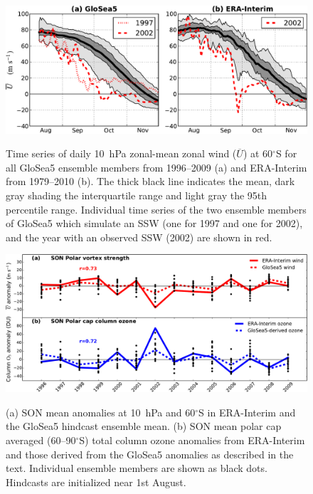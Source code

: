\begin{figure}[t]
  \noindent\includegraphics[width=\textwidth,angle=0]{figures/GloSea5/zmzw_climatologies_crop.pdf}\\
  \caption[Comparison of GloSea5 and ERA-Interim zonal-mean zonal wind climatologies.]{Time series of daily 10~hPa zonal-mean zonal wind ($\overline{U}$) at 60$^{\circ}$S for all GloSea5 ensemble members from 1996--2009 (a) and ERA-Interim from 1979--2010 (b). The thick black line indicates the mean, dark gray shading the interquartile range and light gray the 95th percentile range. Individual time series of the two ensemble members of GloSea5 which simulate an SSW (one for 1997 and one for 2002), and the year with an observed SSW (2002) are shown in red.}\label{Fig1}
\end{figure}

\begin{figure}[t]
  \noindent\includegraphics[width=\textwidth,angle=0]{figures/GloSea5/zmzw_ozone_crop.pdf}\\
  \caption[GloSea5 forecast skill for the stratospheric polar vortex strength and column ozone.]{(a) SON mean anomalies at 10~hPa and 60$^{\circ}$S in ERA-Interim and the GloSea5 hindcast ensemble mean. (b) SON mean polar cap averaged (60--90$^{\circ}$S) total column ozone anomalies from ERA-Interim and those derived from the GloSea5  anomalies as described in the text. Individual ensemble members are shown as black dots. Hindcasts are initialized near 1st August.}\label{Fig2}
\end{figure}

